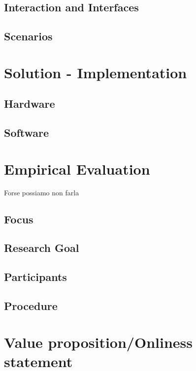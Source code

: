 \documentclass{article}
\begin{document}
    \subsection{Interaction and Interfaces}
    \subsection{Scenarios}


    \newpage

    \section{Solution - Implementation}
    \subsection{Hardware}

    \subsection{Software}
    \newpage

    \section{Empirical Evaluation}Forse possiamo non farla
    \subsection{Focus}
    \subsection{Research Goal}
    \subsection{Participants}
    \subsection{Procedure}
    \newpage

    \section{Value proposition/Onliness statement}
    \newpage
\end{document}
